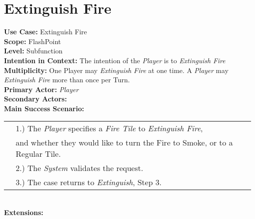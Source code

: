 \documentclass{article}
\begin{document}
	\section*{Extinguish Fire}
	\textbf{Use Case:} Extinguish Fire\\
	\textbf{Scope:} FlashPoint\\
	\textbf{Level:} Subfunction\\
	\textbf{Intention in Context:} The intention of the \textit{Player} is to \textit{Extinguish Fire} \\
	\textbf{Multiplicity: } One Player may \textit{Extinguish Fire} at one time. A \textit{Player} may \textit{Extinguish Fire} more than once per Turn.\\
	\textbf{Primary Actor:} \textit{Player}\\
	\textbf{Secondary Actors:}\\
	\textbf{Main Success Scenario:}\\
	\begin{tabular}{l l}
		&1.) The \textit{Player} specifies a \textit{Fire Tile} to \textit{Extinguish Fire},\\
		&\qquad and whether they would like to turn the Fire to Smoke, or to a Regular Tile.\\
		&2.) The \textit{System} validates the request.\\
		&3.) The case returns to \textit{Extinguish}, Step 3.\\
	\end{tabular}\\
	\textbf{Extensions:}\\
\end{document}

